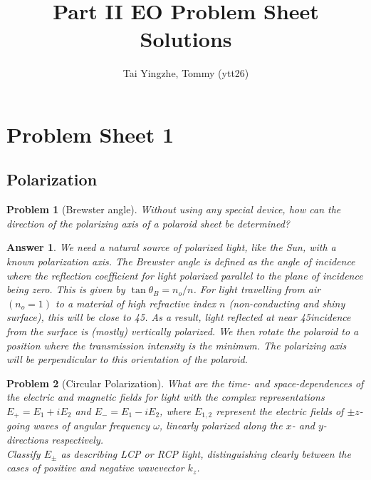 \documentclass[a4paper]{article}
\title{\textbf{Part II EO Problem Sheet Solutions}}
\author{Tai Yingzhe, Tommy (ytt26)}
\date{}
\newtheorem{ans}{Answer}
\theoremstyle{new}
\newtheorem{qns}{Problem}
\begin{document}
\maketitle
\tableofcontents
\newpage
\section{Problem Sheet 1}
\subsection*{Polarization}
\begin{qns}[Brewster angle]
Without using any special device, how can the direction of the polarizing axis of a polaroid sheet be determined?
\end{qns}
\begin{ans}
We need a natural source of polarized light, like the Sun, with a known polarization axis. The Brewster angle is defined as the angle of incidence where the reflection coefficient for light polarized parallel to the plane of incidence being zero. This is given by $\tan\theta_B=n_o/n$. For light travelling from air $(n_o=1)$ to a material of high refractive index $n$ (non-conducting and shiny surface), this will be close to 45\degree. As a result, light reflected at near 45\degree incidence from the surface is (mostly) vertically polarized. We then rotate the polaroid to a position where the transmission intensity is the minimum. The polarizing axis will be perpendicular to this orientation of the polaroid.
\end{ans}
\begin{qns}[Circular Polarization]
What are the time- and space-dependences of the electric and magnetic fields for light with the complex representations $E_+ = E_1 + iE_2$ and $E_-= E_1 − iE_2$, where $E_{1,2}$ represent the electric fields of $\pm z$-going waves of angular frequency $\omega$, linearly polarized along the $x$- and $y$-directions respectively.\\[5pt]
Classify $E_\pm$ as describing LCP or RCP light, distinguishing clearly between the cases of positive and negative wavevector $k_z$.
\end{qns}
\end{document}
